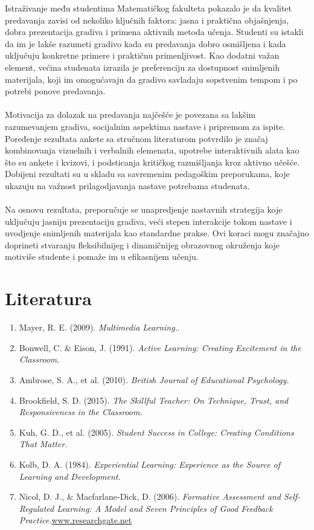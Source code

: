 \documentclass{article}
\begin{document}
Istraživanje među studentima Matematičkog fakulteta pokazalo je da kvalitet predavanja zavisi od nekoliko ključnih faktora: jasna i praktična objašnjenja, dobra prezentacija gradiva i primena aktivnih metoda učenja. Studenti su istakli da im je lakše razumeti gradivo kada su predavanja dobro osmišljena i kada uključuju konkretne primere i praktičnu primenljivost. Kao dodatni važan element, većina studenata izrazila je preferenciju za dostupnost snimljenih materijala, koji im omogućavaju da gradivo savladaju sopstvenim tempom i po potrebi ponove predavanja.
\\ \\
Motivacija za dolazak na predavanja najčešće je povezana sa lakšim razumevanjem gradiva, socijalnim aspektima nastave i pripremom za ispite. Poređenje rezultata ankete sa stručnom literaturom potvrdilo je značaj kombinovanja vizuelnih i verbalnih elemenata, upotrebe interaktivnih alata kao što su ankete i kvizovi, i podsticanja kritičkog razmišljanja kroz aktivno učešće. Dobijeni rezultati su u skladu sa savremenim pedagoškim preporukama, koje ukazuju na važnost prilagodjavanja nastave potrebama studenata.
\\ \\
Na osnovu rezultata, preporučuje se unapredjenje nastavnih strategija koje uključuju jasniju prezentaciju gradiva, veći stepen interakcije tokom nastave i uvodjenje snimljenih materijala kao standardne prakse. Ovi koraci mogu značajno doprineti stvaranju fleksibilnijeg i dinamičnijeg obrazovnog okruženja koje motiviše studente i pomaže im u efikasnijem učenju.
\section{Literatura}
\begin{enumerate}
    \item Mayer, R. E. (2009). \textit{Multimedia Learning.}.
    \item Bonwell, C. \& Eison, J. (1991). \textit{Active Learning: Creating Excitement in the Classroom.}
    \item Ambrose, S. A., et al. (2010). \textit{British Journal of Educational Psychology.}
    \item Brookfield, S. D. (2015). \textit{The Skillful Teacher: On Technique, Trust, and Responsiveness in the Classroom.} 
    \item Kuh, G. D., et al. (2005). \textit{Student Success in College: Creating Conditions That Matter.}
    \item Kolb, D. A. (1984). \textit{Experiential Learning: Experience as the Source of Learning and Development.}
        \item Nicol, D. J., \& Macfarlane-Dick, D. (2006).     \textit{Formative Assessment and Self-Regulated Learning: A Model and Seven Principles of Good Feedback Practice.}\href{https://www.researchgate.net/publication/228621906_Formative_Assessment_and_Self-Regulated_Learning_A_Model_and_Seven_Principles_of_Good_Feedback_Practice}{www.researchgate.net}
\end{enumerate}
\end{document}
